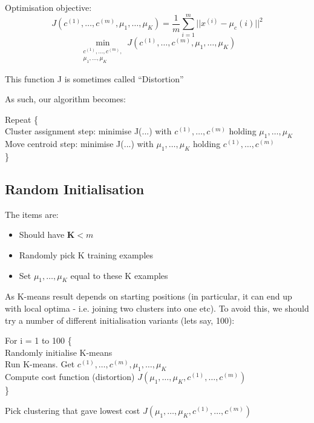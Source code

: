 \documentclass{scrartcl}
\begin{document}
Optimisation objective: \[ J(c^{(1)}, \dots, c^{(m)}, \mu_1, \dots,
\mu_K) = \frac{1}{m} \sum \limits_{i=1}^m || x^{(i)} - \mu_c(i) ||^2
\]
\[ \min \limits_{ \begin{array}{l}
    c^{(1)}, \dots, c^{(m)}, \\
    \mu_1, \dots, \mu_K
  \end{array}} J(c^{(1)}, \dots, c^{(m)}, \mu_1, \dots, \mu_K) \]

This function J is sometimes called ``Distortion''

As such, our algorithm becomes:
\begin{tabbing}
  Repeat \{    \\
  Cluster assignment step: minimise J(...) with $c^{(1)}, \dots,
  c^{(m)}$ holding $\mu_1, \dots, \mu_K$  \\

  Move centroid step: minimise J(...) with  $\mu_1, \dots, \mu_K$
  holding  $c^{(1)}, \dots, c^{(m)}$ \\
  \}
\end{tabbing}

\subsection{Random Initialisation}
\label{sec:13-4}
The items are:
\begin{itemize}
\item Should have $\mathbf{K} < m$
\item Randomly pick K training examples
\item Set $\mu_1, \dots, \mu_K$ equal to these K examples
\end{itemize}

As K-means result depends on starting positions (in particular, it can
end up with local optima - i.e. joining two clusters into one etc). To
avoid this, we should try a number of different initialisation
variants (lets say, 100):

\begin{tabbing}
  For i = 1 to 100 \{    \\
  \quad Randomly initialise K-means \\
  \quad Run K-means. Get $c^{(1)}, \dots,c^{(m)}, \mu_1, \dots, \mu_K$  \\
  \quad Compute cost function (distortion)  $J(\mu_1, \dots, \mu_K, c^{(1)}, \dots, c^{(m)})$ \\
  \}
\end{tabbing}
Pick clustering that gave lowest cost $J(\mu_1, \dots, \mu_K, c^{(1)},
\dots, c^{(m)})$
\end{document}
